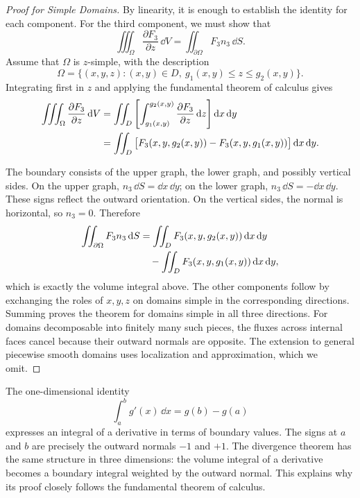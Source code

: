 \begin{proof}[Proof for Simple Domains]
By linearity, it is enough to establish the identity for each component. For the third component, we must show that
\begin{equation}
\iiint_\Omega\frac{\partial F_3}{\partial z}\,\dd V
=\iint_{\partial\Omega}F_3n_3\,\dd S.
\end{equation}
Assume that $\Omega$ is $z$-simple, with the description
\[
\Omega=\{(x,y,z):(x,y)\in D,\ g_1(x,y)\leq z\leq g_2(x,y)\}.
\]
Integrating first in $z$ and applying the fundamental theorem of calculus gives
\begin{align}
\iiint_\Omega\frac{\partial F_3}{\partial z}\,\mathrm{d} V
&=\iint_D\left[\int_{g_1(x,y)}^{g_2(x,y)}\frac{\partial F_3}{\partial z}\,\mathrm{d} z\right]\mathrm{d} x\,\mathrm{d} y\notag\\
&=\iint_D\big[F_3(x,y,g_2(x,y))-F_3(x,y,g_1(x,y))\big]\,\mathrm{d} x\,\mathrm{d} y.
\end{align}

The boundary consists of the upper graph, the lower graph, and possibly vertical sides. On the upper graph, $n_3\,\dd S=\dd x\,\dd y$; on the lower graph, $n_3\,\dd S=-\dd x\,\dd y$. These signs reflect the outward orientation. On the vertical sides, the normal is horizontal, so $n_3=0$. Therefore
\begin{align}
\iint_{\partial\Omega}F_3n_3\,\mathrm{d} S
&=\iint_D F_3(x,y,g_2(x,y))\,\mathrm{d} x\,\mathrm{d} y\notag\\
&\quad-\iint_D F_3(x,y,g_1(x,y))\,\mathrm{d} x\,\mathrm{d} y,
\end{align}
which is exactly the volume integral above. The other components follow by exchanging the roles of $x,y,z$ on domains simple in the corresponding directions. Summing proves the theorem for domains simple in all three directions. For domains decomposable into finitely many such pieces, the fluxes across internal faces cancel because their outward normals are opposite. The extension to general piecewise smooth domains uses localization and approximation, which we omit.
\end{proof}

\begin{remark}
The one-dimensional identity \[
\int_a^b g'(x)\,\dd x=g(b)-g(a)
\] expresses an integral of a derivative in terms of boundary values. The signs at $a$ and $b$ are precisely the outward normals $-1$ and $+1$. The divergence theorem has the same structure in three dimensions: the volume integral of a derivative becomes a boundary integral weighted by the outward normal. This explains why its proof closely follows the fundamental theorem of calculus.
\end{remark}

